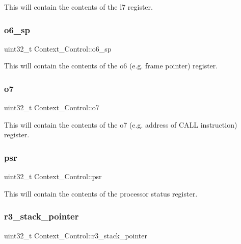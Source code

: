 This will contain the contents of the l7 register. \mbox{\label{structContext__Control_a1b815b8d8650183777b62fdc8c2aa1e2}} 
\subsubsection{\texorpdfstring{o6\_sp}{o6\_sp}}
{\footnotesize\ttfamily uint32\+\_\+t Context\+\_\+\+Control\+::o6\+\_\+sp}

This will contain the contents of the o6 (e.\+g. frame pointer) register. \mbox{\label{structContext__Control_a68d867ad2bb9051ba04b4a7e1d955292}} 
\subsubsection{\texorpdfstring{o7}{o7}}
{\footnotesize\ttfamily uint32\+\_\+t Context\+\_\+\+Control\+::o7}

This will contain the contents of the o7 (e.\+g. address of C\+A\+LL instruction) register. \mbox{\label{structContext__Control_a6658aa1fe056bed9ad9cc3a3188e06f0}} 
\subsubsection{\texorpdfstring{psr}{psr}}
{\footnotesize\ttfamily uint32\+\_\+t Context\+\_\+\+Control\+::psr}

This will contain the contents of the processor status register. \mbox{\label{structContext__Control_ac6994ddfd3c299326a422b5c87783258}} 
\subsubsection{\texorpdfstring{r3\_stack\_pointer}{r3\_stack\_pointer}}
{\footnotesize\ttfamily uint32\+\_\+t Context\+\_\+\+Control\+::r3\+\_\+stack\+\_\+pointer}

